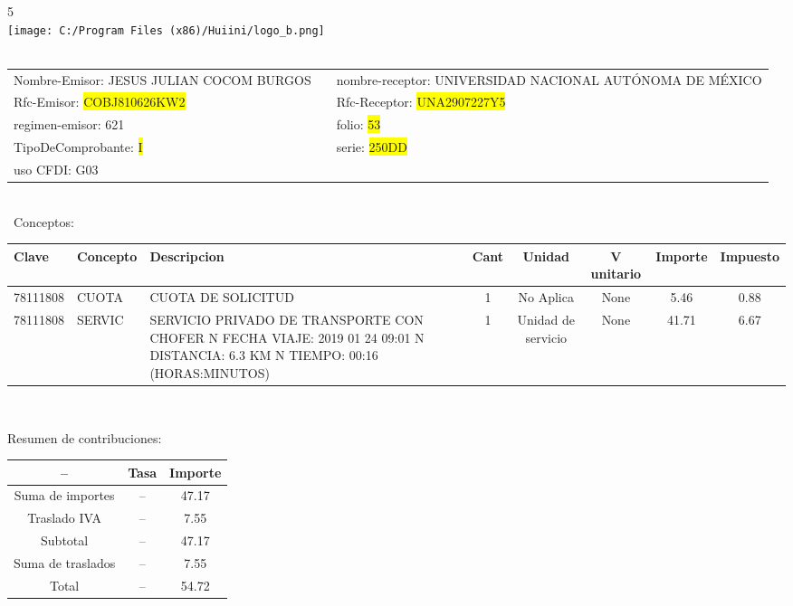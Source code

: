 \documentclass{article}
\begin{document}
\hspace{18cm} 5\\
\texttt{[image: C:/Program Files (x86)/Huiini/logo\_b.png]}
\bigskip\\\
\begin{tabular}{p{11cm}p{1cm}p{8cm}}

Nombre-Emisor: JESUS JULIAN COCOM BURGOS && nombre-receptor: UNIVERSIDAD NACIONAL AUTÓNOMA DE MÉXICO\\

Rfc-Emisor: \colorbox{yellow}{ COBJ810626KW2 } & & Rfc-Receptor: \colorbox{yellow}{ UNA2907227Y5 }\\

regimen-emisor: 621 & & folio: \colorbox{yellow}{ 53 }\\

TipoDeComprobante: \colorbox{yellow}{ I } & & serie: \colorbox{yellow}{ 250DD }\\

uso CFDI: G03\\



\end{tabular}
\bigskip\bigskip\bigskip\\\
Conceptos:\\
\begin{tabular}{|p{1.5cm}|p{3.6cm}|p{3.6cm}|c|c|c|c|c|}
\hline
Clave & Concepto & Descripcion & Cant & Unidad & V unitario & Importe & Impuesto \\
\hline

78111808 & CUOTA  & CUOTA DE SOLICITUD & 1 & No Aplica & None & 5.46 &  0.88 \\
\hline

78111808 & SERVIC & SERVICIO PRIVADO DE TRANSPORTE CON CHOFER  N FECHA VIAJE: 2019 01 24 09:01  N DISTANCIA: 6.3 KM  N TIEMPO: 00:16 (HORAS:MINUTOS) & 1 & Unidad de servicio & None & 41.71 &  6.67 \\
\hline

\end{tabular}\\
\bigskip
\begin{center}
Resumen de contribuciones:\\
\bigskip
\begin{tabular}{|c|c|c|}
\hline
 -- & Tasa & Importe\\
\hline

Suma de importes & -- & 47.17 \\
\hline

Traslado IVA & -- & 7.55 \\
\hline

Subtotal  & -- & 47.17 \\
\hline

Suma de traslados & -- & 7.55 \\
\hline

Total  & -- & 54.72 \\
\hline

\end{tabular}
\end{center}
\end{document}
